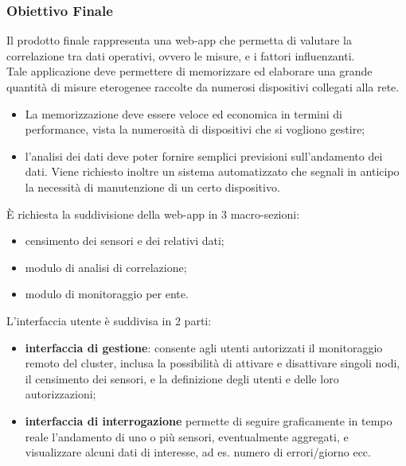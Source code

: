 	\subsubsection{Obiettivo Finale}
	Il prodotto finale rappresenta una web-app che permetta di valutare la correlazione tra dati operativi, ovvero le misure, e i fattori influenzanti.\\
	Tale applicazione deve permettere di memorizzare ed elaborare una grande quantità di misure eterogenee raccolte da numerosi dispositivi collegati alla rete.
	\begin{itemize}
		\item La memorizzazione deve essere veloce ed economica in termini di performance, vista la numerosità di dispositivi che si vogliono gestire; 
		\item l'analisi dei dati deve poter fornire semplici previsioni sull'andamento dei dati. 
		Viene richiesto inoltre un sistema automatizzato che segnali in anticipo la necessità di manutenzione di un certo dispositivo.	
	\end{itemize}
	È richiesta la suddivisione della web-app in 3 macro-sezioni:
	\begin{itemize}
		\item censimento dei sensori e dei relativi dati; 
		\item modulo di analisi di correlazione; 
		\item modulo di monitoraggio per ente.
	\end{itemize}
	L'interfaccia utente è suddivisa in 2 parti:
	\begin{itemize}
	\item \textbf{interfaccia di gestione}: consente agli utenti autorizzati il monitoraggio remoto del cluster, inclusa la possibilità di attivare e disattivare singoli nodi, il censimento dei sensori, e la definizione degli utenti e delle loro autorizzazioni; 
	\item \textbf{interfaccia di interrogazione} permette di seguire graficamente in tempo reale l’andamento di uno o più sensori, eventualmente aggregati, e visualizzare alcuni dati di interesse, ad es. numero di errori/giorno ecc.
	\end{itemize}

